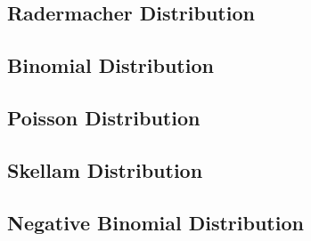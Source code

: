 \documentclass[11pt]{report} %
\begin{document}
\subsection{Radermacher Distribution}

\subsection{Binomial Distribution}

\subsection{Poisson Distribution}

\subsection{Skellam Distribution}

\subsection{Negative Binomial Distribution}
\end{document}
